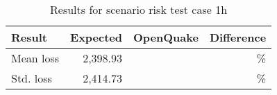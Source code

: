 \begin{table}[htbp]

\centering
\begin{tabular}{ l r r r }

\hline
\rowcolor{anti-flashwhite}
\bf{Result} & \bf{Expected} & \bf{OpenQuake} & \bf{Difference}\\
\hline
Mean loss & 2,398.93 &  & \% \\
Std. loss & 2,414.73 &  & \% \\
\hline
\end{tabular}

\caption{Results for scenario risk test case 1h}
\label{tab:result-scenario-risk-1h}
\end{table}